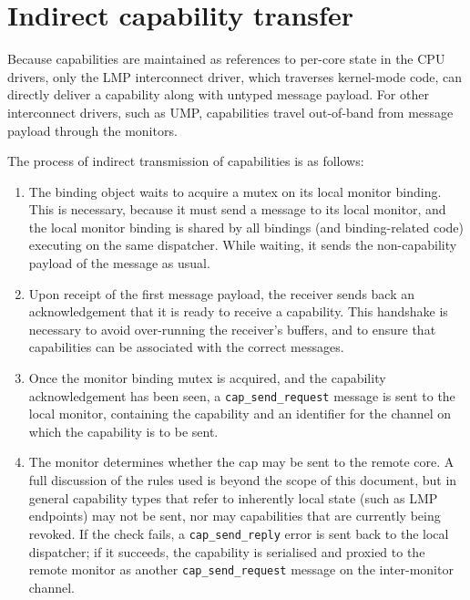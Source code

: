 \documentclass[a4paper,twoside]{report} %
\begin{document}
\section{Indirect capability transfer}
\label{sec:capxfer}

Because capabilities are maintained as references to per-core state in the
CPU drivers, only the LMP interconnect driver, which traverses kernel-mode
code, can directly deliver a capability along with untyped message payload.
For other interconnect drivers, such as UMP, capabilities travel out-of-band
from message payload through the monitors.

The process of indirect transmission of capabilities is as follows:
\begin{enumerate}
 \item The binding object waits to acquire a mutex on its local monitor binding.
     This is necessary, because it must send a message to its local monitor, and
     the local monitor binding is shared by all bindings (and binding-related
     code) executing on the same dispatcher. While waiting, it sends the
     non-capability payload of the message as usual.

  \item Upon receipt of the first message payload, the receiver sends back an
     acknowledgement that it is ready to receive a capability. This handshake
     is necessary to avoid over-running the receiver's buffers, and to ensure
     that capabilities can be associated with the correct messages.

  \item Once the monitor binding mutex is acquired, and the capability
     acknowledgement has been seen, a \lstinline+cap_send_request+ message
     is sent to the local monitor, containing the capability and an identifier
     for the channel on which the capability is to be sent.

  \item The monitor determines whether the cap may be sent to the remote core.
    A full discussion of the rules used is beyond the scope of this document,
    but in general capability types that refer to inherently local state (such
    as LMP endpoints) may not be sent, nor may capabilities that are currently
    being revoked. If the check fails, a \lstinline+cap_send_reply+ error is
    sent back to the local dispatcher; if it succeeds, the capability is
    serialised and proxied to the remote monitor as another
    \lstinline+cap_send_request+ message on the inter-monitor channel.


\end{enumerate}
\end{document}
